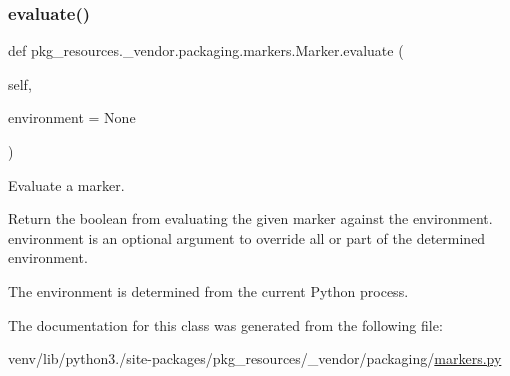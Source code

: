 \mbox{\label{classpkg__resources_1_1__vendor_1_1packaging_1_1markers_1_1Marker_a62689e75e765ae2bcfbd0a166c5f8894}} 
\subsubsection{\texorpdfstring{evaluate()}{evaluate()}}
{\footnotesize\ttfamily def pkg\+\_\+resources.\+\_\+vendor.\+packaging.\+markers.\+Marker.\+evaluate (\begin{DoxyParamCaption}\item[{}]{self,  }\item[{}]{environment = {\ttfamily None} }\end{DoxyParamCaption})}

\begin{DoxyVerb}Evaluate a marker.

Return the boolean from evaluating the given marker against the
environment. environment is an optional argument to override all or
part of the determined environment.

The environment is determined from the current Python process.
\end{DoxyVerb}
 

The documentation for this class was generated from the following file\+:\begin{DoxyCompactItemize}
\item 
venv/lib/python3./site-\/packages/pkg\+\_\+resources/\+\_\+vendor/packaging/\hyperlink{pkg__resources_2__vendor_2packaging_2markers_8py}{markers.\+py}\end{DoxyCompactItemize}
